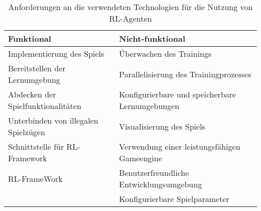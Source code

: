     \begin{table}[h]
        \centering

        \label{tab:requirements}
        \begin{tabular}{|l|p{10cm}|}
        \hline
        \textbf{Funktional} & \textbf{Nicht-funktional} \\
        \hline
        Implementierung des Spiels & Überwachen des Trainings \\
        \hline
        Bereitstellen der Lernumgebung & Parallelisierung des Trainingprozesses \\
        \hline
        Abdecken der Spielfunktionalitäten & Konfigurierbare und speicherbare Lernumgebungen \\
        \hline
        Unterbinden von illegalen Spielzügen & Visualisierung des Spiels \\
        \hline
        Schnittstelle für RL-Framework & Verwendung einer leistungsfähigen Gameengine \\
        \hline
        RL-FrameWork& Benutzerfreundliche Entwicklungsumgebung \\
        \hline
        & Konfigurierbare Spielparameter \\
        \hline
        \end{tabular}
        \caption{Anforderungen an die verwendeten Technologien für die Nutzung von RL-Agenten}
    \end{table}

